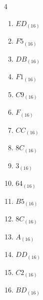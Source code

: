 \begin{multicols}{4}
\begin{enumerate}
  \item $ED_{(16)}$

        \phantom{$=237$}

  \item $F5_{(16)}$

        \phantom{$=245$}

  \item $DB_{(16)}$

        \phantom{$=219$}

  \item $F1_{(16)}$

        \phantom{$=241$}

  \item $C9_{(16)}$

        \phantom{$=201$}

  \item $F_{(16)}$

        \phantom{$=15$}

  \item $CC_{(16)}$

        \phantom{$=204$}

  \item $8C_{(16)}$

        \phantom{$=140$}

  \item $3_{(16)}$

        \phantom{$=3$}

  \item $64_{(16)}$

        \phantom{$=100$}

  \item $B5_{(16)}$

        \phantom{$=181$}

  \item $8C_{(16)}$

        \phantom{$=140$}

  \item $A_{(16)}$

        \phantom{$=10$}

\columnbreak %

  \item $DD_{(16)}$

        \phantom{$=221$}

  \item $C2_{(16)}$

        \phantom{$=194$}

  \item $BD_{(16)}$


\end{enumerate}
\end{multicols}
